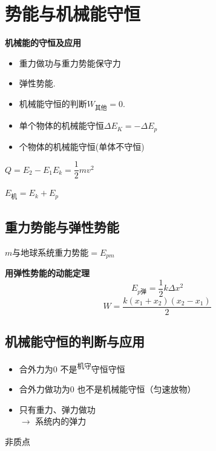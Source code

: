 \section{势能与机械能守恒}
\textbf{机械能的守恒及应用}
\begin{itemize}
\item 重力做功与重力势能\quad 保守力
\item 弹性势能.
\item 机械能守恒的判断\quad $W_{\text{其他}}=0$.
\item 单个物体的机械能守恒\quad $\Delta E_K=-\Delta E_p$
\item {}个物体的机械能守恒\quad (单体不守恒) %
\end{itemize}

$Q=E_2-E_1$\qquad $E_k=\dfrac12mv^2$

$E_{\text{机}}=E_k+E_p$

\subsection{重力势能与弹性势能}
$m$与地球系统重力势能$=E_{pm}$

\textbf{用弹性势能的动能定理}
\[
E_{p\text{弹}}=\dfrac{1}{2}k\Delta x^2
\]
\[
W=\dfrac{k(x_1+x_2)(x_2-x_1)}{2}
\]

\subsection{机械能守恒的判断与应用}
\begin{itemize}
\item 合外力为0 不是\textsuperscript{机守}守恒守恒 %
\item 合外力做功为0 也不是机械能守恒\quad（匀速放物） %
\item 只有重力、弹力做功\\
  $\to$ 系统内的弹力
\end{itemize}


非质点

